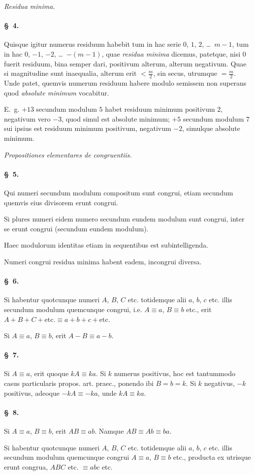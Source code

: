 \documentclass[12pt,a4paper]{article}
\theoremstyle{plain}
\theoremstyle{definition}
\theoremstyle{remark}
\newcommand{\art}[1]{\paragraph{\S\ #1.}}
\begin{document}
\begin{center}
\textit{Residua minima.}
\end{center}

\art{4}
Quisque igitur numerus residuum habebit tum in hac serie $0$, $1$, $2$, \ldots\ $m-1$, tum in hac $0$, $-1$, $-2$, \ldots\ $-(m-1)$, quae \emph{residua minima} dicemus, patetque, nisi $0$ fuerit residuum, bina semper dari, positivum alterum, alterum negativum. Quae si magnitudine sunt inaequalia, alterum erit $< \frac{m}{2}$, sin secus, utrumque $= \frac{m}{2}$. Unde patet, quemvis numerum residuum habere modulo semissem non superans quod \emph{absolute minimum} vocabitur.

E.~g. $+13$ secundum modulum $5$ habet residuum minimum positivum $2$, negativum vero $-3$, quod simul est absolute minimum; $+5$ secundum modulum $7$ sui ipsius est residuum minimum positivum, negativum $-2$, simulque absolute minimum.

\begin{center}
\textit{Propositiones elementares de congruentiis.}
\end{center}

\art{5}
Qui numeri secundum modulum compositum sunt congrui, etiam secundum quemvis eius divisorem erunt congrui.

Si plures numeri eidem numero secundum eundem modulum sunt congrui, inter se erunt congrui (secundum eundem modulum).

Haec modulorum identitas etiam in sequentibus est subintelligenda.

Numeri congrui residua minima habent eadem, incongrui diversa.

\art{6}
Si habentur quotcunque numeri $A$, $B$, $C$ etc. totidemque alii $a$, $b$, $c$ etc. illis secundum modulum quemcunque congrui, i.e. $A \equiv a$, $B \equiv b$ etc., erit $A + B + C + \text{etc.} \equiv a + b + c + \text{etc.}$

Si $A \equiv a$, $B \equiv b$, erit $A - B \equiv a - b$.

\art{7}
Si $A \equiv a$, erit quoque $kA \equiv ka$. Si $k$ numerus positivus, hoc est tantummodo casus particularis propos. art. praec., ponendo ibi $B = b = k$. Si $k$ negativus, $-k$ positivus, adeoque $-kA \equiv -ka$, unde $kA \equiv ka$.

\art{8}
Si $A \equiv a$, $B \equiv b$, erit $AB \equiv ab$. Namque $AB \equiv Ab \equiv ba$.

Si habentur quotcunque numeri $A$, $B$, $C$ etc. totidemque alii $a$, $b$, $c$ etc. illis secundum modulum quemcunque congrui $A \equiv a$, $B \equiv b$ etc., producta ex utrisque erunt congrua, $ABC$ etc. $\equiv abc$ etc.
\end{document}
